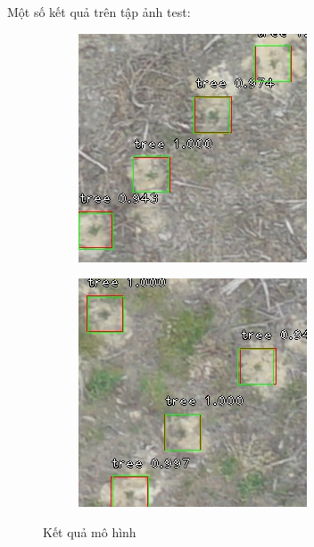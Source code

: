 \documentclass[a4paper, 12pt]{report}
\begin{document}
Một số kết quả trên tập ảnh test:
\begin{figure}[!h]
    \centering
    \begin{subfigure}[!h]{0.45\textwidth}
    \includegraphics[width=\linewidth]{Images/detect_res/Img_RSKA003603_0_r1536_c1536}
        \label{fig:subfig1}
    \end{subfigure}%
    \quad
    \begin{subfigure}[!h]{0.45\textwidth}
    \includegraphics[width=\linewidth]{Images/detect_res/Img_RSKA003603_0_r1920_c1920}
        \label{fig:subfig2}
    \end{subfigure}
    \caption[Optional caption for list of figures]{Kết quả mô hình}
    \label{fig:demo_split}
\end{figure}
\end{document}
